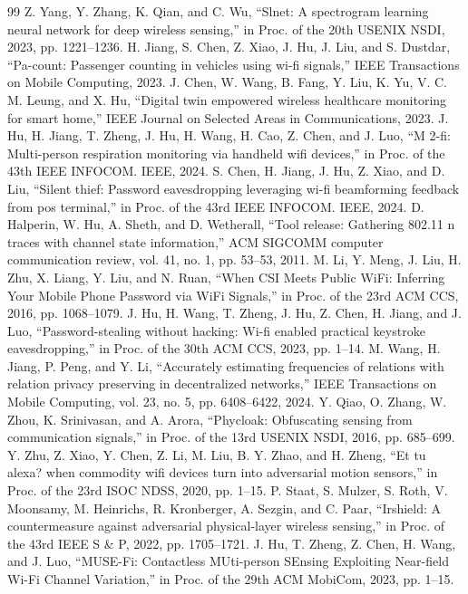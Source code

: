 \documentclass[journal]{IEEEtran}
\begin{document}
\begin{thebibliography}{99}
 Z. Yang, Y. Zhang, K. Qian, and C. Wu, “Slnet: A spectrogram learning neural network for deep wireless sensing,” in Proc. of the 20th USENIX NSDI, 2023, pp. 1221–1236.
 H. Jiang, S. Chen, Z. Xiao, J. Hu, J. Liu, and S. Dustdar, “Pa-count: Passenger counting in vehicles using wi-fi signals,” IEEE Transactions on Mobile Computing, 2023.
 J. Chen, W. Wang, B. Fang, Y. Liu, K. Yu, V. C. M. Leung, and X. Hu, “Digital twin empowered wireless healthcare monitoring for smart home,” IEEE Journal on Selected Areas in Communications, 2023.
 J. Hu, H. Jiang, T. Zheng, J. Hu, H. Wang, H. Cao, Z. Chen, and J. Luo, “M 2-fi: Multi-person respiration monitoring via handheld wifi devices,” in Proc. of the 43th IEEE INFOCOM. IEEE, 2024.
 S. Chen, H. Jiang, J. Hu, Z. Xiao, and D. Liu, “Silent thief: Password eavesdropping leveraging wi-fi beamforming feedback from pos terminal,” in Proc. of the 43rd IEEE INFOCOM. IEEE, 2024.
 D. Halperin, W. Hu, A. Sheth, and D. Wetherall, “Tool release: Gathering 802.11 n traces with channel state information,” ACM SIGCOMM computer communication review, vol. 41, no. 1, pp. 53–53, 2011.
 M. Li, Y. Meng, J. Liu, H. Zhu, X. Liang, Y. Liu, and N. Ruan, “When CSI Meets Public WiFi: Inferring Your Mobile Phone Password via WiFi Signals,” in Proc. of the 23rd ACM CCS, 2016, pp. 1068–1079.
 J. Hu, H. Wang, T. Zheng, J. Hu, Z. Chen, H. Jiang, and J. Luo, “Password-stealing without hacking: Wi-fi enabled practical keystroke eavesdropping,” in Proc. of the 30th ACM CCS, 2023, pp. 1–14.
 M. Wang, H. Jiang, P. Peng, and Y. Li, “Accurately estimating frequencies of relations with relation privacy preserving in decentralized networks,” IEEE Transactions on Mobile Computing, vol. 23, no. 5, pp. 6408–6422, 2024.
 Y. Qiao, O. Zhang, W. Zhou, K. Srinivasan, and A. Arora, “Phycloak: Obfuscating sensing from communication signals,” in Proc. of the 13rd USENIX NSDI, 2016, pp. 685–699.
 Y. Zhu, Z. Xiao, Y. Chen, Z. Li, M. Liu, B. Y. Zhao, and H. Zheng, “Et tu alexa? when commodity wifi devices turn into adversarial motion sensors,” in Proc. of the 23rd ISOC NDSS, 2020, pp. 1–15.
 P. Staat, S. Mulzer, S. Roth, V. Moonsamy, M. Heinrichs, R. Kronberger, A. Sezgin, and C. Paar, “Irshield: A countermeasure against adversarial physical-layer wireless sensing,” in Proc. of the 43rd IEEE S \& P, 2022, pp. 1705–1721.
 J. Hu, T. Zheng, Z. Chen, H. Wang, and J. Luo, “MUSE-Fi: Contactless MUti-person SEnsing Exploiting Near-field Wi-Fi Channel Variation,” in Proc. of the 29th ACM MobiCom, 2023, pp. 1–15.

\end{thebibliography}
\end{document}
